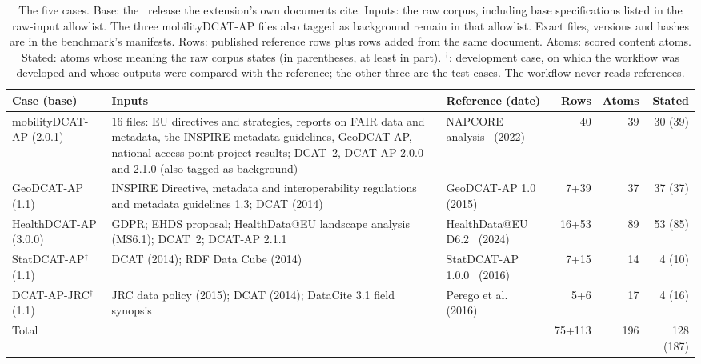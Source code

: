 \begin{table}[!t]
\caption{The five cases. Base: the \dcatap\ release the extension's own documents cite. Inputs: the raw corpus, including base specifications listed in the raw-input allowlist. The three mobilityDCAT-AP files also tagged as background remain in that allowlist. Exact files, versions and hashes are in the benchmark's manifests. Rows: published reference rows plus rows added from the same document. Atoms: scored content atoms. Stated: atoms whose meaning the raw corpus states (in parentheses, at least in part). $^{\dagger}$: development case, on which the workflow was developed and whose outputs were compared with the reference; the other three are the test cases. The workflow never reads references.}
\label{tab:benchmark}
\centering\scriptsize\setlength{\tabcolsep}{3pt}
\begin{tabularx}{\textwidth}{@{}p{2.0cm}Xp{2.3cm}rrr@{}}
\toprule
Case (base) & Inputs & Reference (date) & Rows & Atoms & Stated\\
\midrule
mobilityDCAT-AP (2.0.1) & 16 files: EU directives and strategies, reports on FAIR data and metadata, the INSPIRE metadata guidelines, GeoDCAT-AP, national-access-point project results; DCAT~2, DCAT-AP 2.0.0 and 2.1.0 (also tagged as background) & NAPCORE analysis~\cite{bures2022napcore} (2022) & 40 & 39 & 30 (39)\\
GeoDCAT-AP (1.1) & INSPIRE Directive, metadata and interoperability regulations and metadata guidelines 1.3; DCAT (2014) & GeoDCAT-AP 1.0~\cite{geodcatap10} (2015) & 7+39 & 37 & 37 (37)\\
HealthDCAT-AP (3.0.0) & GDPR; EHDS proposal; HealthData@EU landscape analysis (MS6.1); DCAT~2; DCAT-AP 2.1.1 & HealthData@EU D6.2~\cite{healthdataeu2024d62} (2024) & 16+53 & 89 & 53 (85)\\
StatDCAT-AP$^{\dagger}$ (1.1) & DCAT (2014); RDF Data Cube (2014) & StatDCAT-AP 1.0.0~\cite{statdcatap} (2016) & 7+15 & 14 & 4 (10)\\
DCAT-AP-JRC$^{\dagger}$ (1.1) & JRC data policy (2015); DCAT (2014); DataCite 3.1 field synopsis & Perego et al.~\cite{perego2016jrc} (2016) & 5+6 & 17 & 4 (16)\\
\midrule
Total & & & 75+113 & 196 & 128 (187)\\
\bottomrule
\end{tabularx}
\end{table}
